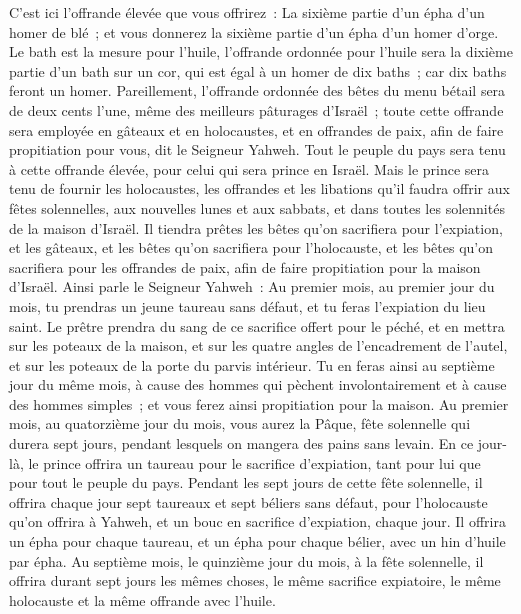 \begin{multicols}{2}
C'est ici l'offrande élevée que vous offrirez~: La sixième partie d'un épha d'un homer de blé~; et vous donnerez la sixième partie d'un épha d'un homer d'orge.
Le bath est la mesure pour l'huile, l'offrande ordonnée pour l'huile sera la dixième partie d'un bath sur un cor, qui est égal à un homer de dix baths~; car dix baths feront un homer.
Pareillement, l'offrande ordonnée des bêtes du menu bétail sera de deux cents l'une, même des meilleurs pâturages d'Israël~; toute cette offrande sera employée en gâteaux et en holocaustes, et en offrandes de paix, afin de faire propitiation pour vous, dit le Seigneur Yahweh.
Tout le peuple du pays sera tenu à cette offrande élevée, pour celui qui sera prince en Israël.
Mais le prince sera tenu de fournir les holocaustes, les offrandes et les libations qu'il faudra offrir aux fêtes solennelles, aux nouvelles lunes et aux sabbats, et dans toutes les solennités de la maison d'Israël. Il tiendra prêtes les bêtes qu'on sacrifiera pour l'expiation, et les gâteaux, et les bêtes qu'on sacrifiera pour l'holocauste, et les bêtes qu'on sacrifiera pour les offrandes de paix, afin de faire propitiation pour la maison d'Israël.
Ainsi parle le Seigneur Yahweh~: Au premier mois, au premier jour du mois, tu prendras un jeune taureau sans défaut, et tu feras l'expiation du lieu saint.
Le prêtre prendra du sang de ce sacrifice offert pour le péché, et en mettra sur les poteaux de la maison, et sur les quatre angles de l'encadrement de l'autel, et sur les poteaux de la porte du parvis intérieur.
Tu en feras ainsi au septième jour du même mois, à cause des hommes qui pèchent involontairement et à cause des hommes simples~; et vous ferez ainsi propitiation pour la maison.
Au premier mois, au quatorzième jour du mois, vous aurez la Pâque, fête solennelle qui durera sept jours, pendant lesquels on mangera des pains sans levain.
En ce jour-là, le prince offrira un taureau pour le sacrifice d'expiation, tant pour lui que pour tout le peuple du pays.
Pendant les sept jours de cette fête solennelle, il offrira chaque jour sept taureaux et sept béliers sans défaut, pour l'holocauste qu'on offrira à Yahweh, et un bouc en sacrifice d'expiation, chaque jour.
Il offrira un épha pour chaque taureau, et un épha pour chaque bélier, avec un hin d'huile par épha.
Au septième mois, le quinzième jour du mois, à la fête solennelle, il offrira durant sept jours les mêmes choses, le même sacrifice expiatoire, le même holocauste et la même offrande avec l'huile.

\end{multicols}
